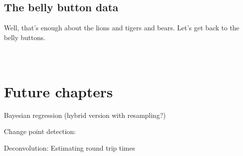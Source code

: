 \documentclass[12pt]{book}
\begin{document}
\section{The belly button data}

Well, that's enough about the lions and tigers and bears.
Let's get back to the belly buttons.

\begin{verbatim}
\end{verbatim}

\begin{verbatim}
\end{verbatim}

\begin{verbatim}
\end{verbatim}




\chapter{Future chapters}

Bayesian regression (hybrid version with resampling?)

Change point detection: 

Deconvolution: Estimating round trip times
\end{document}
